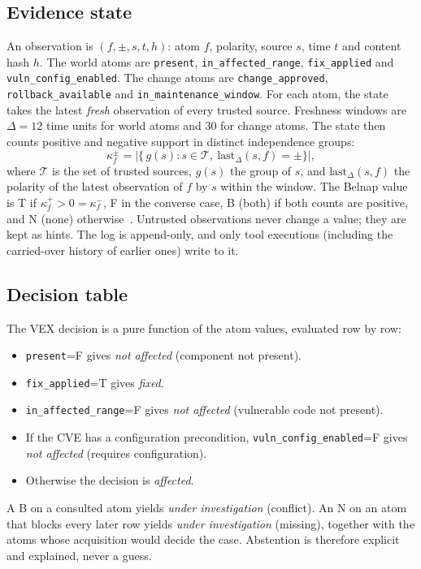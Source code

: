\documentclass[conference]{IEEEtran}
\newcommand{\Bel}[1]{\textsf{#1}}
\begin{document}
\subsection{Evidence state}

An observation is $(f, \pm, s, t, h)$: atom $f$, polarity, source $s$, time $t$ and content hash $h$. The
world atoms are \texttt{present}, \texttt{in\_affected\_range}, \texttt{fix\_applied} and
\texttt{vuln\_config\_enabled}. The change atoms are \texttt{change\_approved},
\texttt{rollback\_available} and \texttt{in\_maintenance\_window}. For each atom, the state takes the
latest \emph{fresh} observation of every trusted source. Freshness windows are $\Delta=12$ time units for
world atoms and $30$ for change atoms. The state then counts positive and negative support in distinct
independence groups:
\begin{equation}
\kappa^{\pm}_f = \bigl|\{\,g(s) : s\in\mathcal{T},\ \mathrm{last}_\Delta(s,f)=\pm\}\bigr|,
\end{equation}
where $\mathcal{T}$ is the set of trusted sources, $g(s)$ the group of $s$, and
$\mathrm{last}_\Delta(s,f)$ the polarity of the latest observation of $f$ by $s$ within the window.
The Belnap value is \Bel{T} if $\kappa^+_f>0=\kappa^-_f$, \Bel{F} in the converse case, \Bel{B} (both) if
both counts are positive, and \Bel{N} (none) otherwise~\cite{belnap1977useful}. Untrusted observations
never change a value; they are kept as hints. The log is append-only, and only tool executions (including the carried-over history of earlier ones)
write to it.

\subsection{Decision table}

The VEX decision is a pure function of the atom values, evaluated row by row:
\begin{itemize}
\item \texttt{present}=\Bel{F} gives \emph{not affected} (component not present).
\item \texttt{fix\_applied}=\Bel{T} gives \emph{fixed}.
\item \texttt{in\_affected\_range}=\Bel{F} gives \emph{not affected} (vulnerable code not present).
\item If the CVE has a configuration precondition, \texttt{vuln\_config\_enabled}=\Bel{F} gives
  \emph{not affected} (requires configuration).
\item Otherwise the decision is \emph{affected}.
\end{itemize}
A \Bel{B} on a consulted atom yields \emph{under investigation} (conflict). An \Bel{N} on an atom that
blocks every later row yields \emph{under investigation} (missing), together with the atoms whose
acquisition would decide the case.
Abstention is therefore explicit and explained, never a guess.
\end{document}
